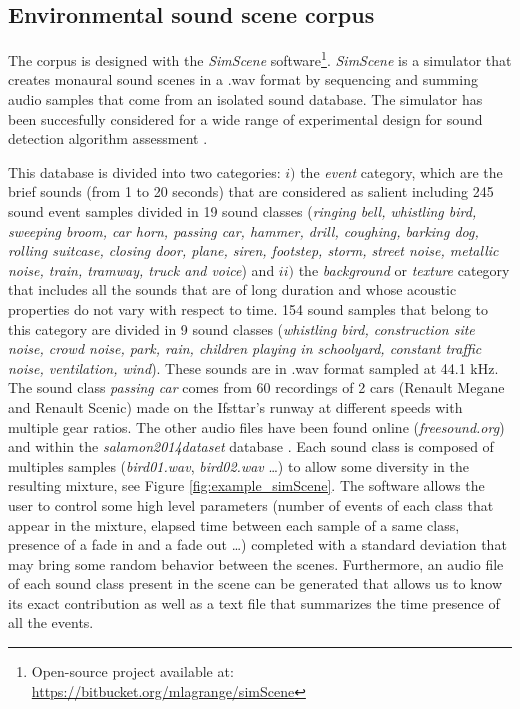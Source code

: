 \documentclass[twocolumn]{svjour3}          %
\begin{document}
\subsection{Environmental sound scene corpus}

The corpus is designed with the \textit{SimScene} software\footnote{Open-source project available at: \url{https://bitbucket.org/mlagrange/simScene}}. \textit{SimScene} \cite{rossignol_simscene:_2015} is a simulator that creates monaural sound scenes in a .wav format by sequencing and summing audio samples that come from an isolated sound database. The simulator has been succesfully considered for a wide range of experimental design for sound detection algorithm assessment \cite{lafay:hal-01111381} \cite{benetos:hal-01520194} \cite{mesaros:hal-01650601}.

This database is divided into two categories: $i)$ the \textit{event} category, which are the brief sounds (from 1 to 20 seconds) that are considered as salient including 245 sound event samples divided in 19 sound classes (\textit{ringing bell, whistling bird, sweeping broom, car horn, passing car, hammer, drill, coughing, barking dog, rolling suitcase, closing door, plane, siren, footstep, storm, street noise, metallic noise, train, tramway, truck and voice}) and $ii)$ the \textit{background} or \textit{texture} category that includes all the sounds that are of long duration and whose acoustic properties do not vary with respect to time. 154 sound samples that belong to this category are divided in 9 sound classes (\textit{whistling bird, construction site noise, crowd noise, park, rain, children playing in schoolyard, constant traffic noise, ventilation, wind}). These sounds are in .wav format sampled at 44.1 kHz. The sound class \textit{passing car} comes from 60 recordings of 2 cars (Renault Megane and Renault Scenic) made on the Ifsttar's runway at different speeds with multiple gear ratios. The other audio files have been found online (\textit{freesound.org}) and within the \textit{salamon2014dataset} database \cite{salamon_dataset_nodate}. Each sound class is composed of multiples samples (\textit{bird01.wav}, \textit{bird02.wav} \dots) to allow some diversity in the resulting mixture, see Figure \ref{fig:example_simScene}. The software allows the user to control some high level parameters (number of events of each class that appear in the mixture, elapsed time between each sample of a same class, presence of a fade in and a fade out \dots) completed with a standard deviation that may bring some random behavior between the scenes. Furthermore, an audio file of each sound class present in the scene can be generated that allows us to know its exact contribution as well as a text file that summarizes the time presence of all the events.\\
\end{document}
